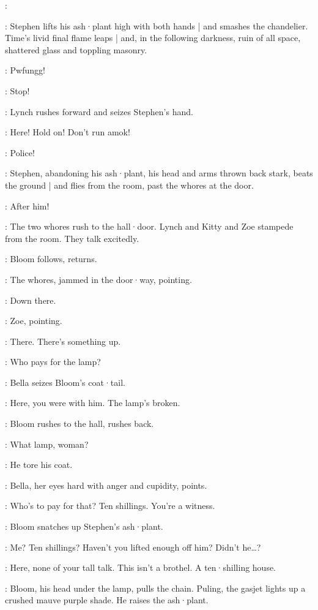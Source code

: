 \Stephen:

:
Stephen lifts his ash·plant high with both hands |
and smashes the chandelier.
Time's livid final flame leaps |
and,
in the following darkness,
ruin of all space,
shattered glass and toppling masonry.

\Gasjet[2]:
Pwfungg!

\Bloom:
Stop!

:
Lynch rushes forward and seizes Stephen's hand.

\Lynch:
Here!
Hold on!
Don't run amok!

\Bella:
Police!

:
Stephen,
abandoning his ash·plant,
his head and arms thrown back stark,
beats the ground |
and flies from the room,
past the whores at the door.

\Bella:
After him!

:
The two whores rush to the hall·door.
%
Lynch and Kitty and Zoe stampede from the room.
They talk excitedly.

:
Bloom follows,
returns.

:
The whores,
jammed in the door·way,
pointing.

\Whores:
Down there.

:
Zoe,
pointing.

\Zoe:
There.
There's something up.

\Bella:
Who pays for the lamp?

:
Bella seizes Bloom's coat·tail.

\Bella:
Here,
you were with him.
The lamp's broken.

:
Bloom rushes to the hall,
rushes back.

\Bloom:
What lamp,
woman?

\AWhore:
He tore his coat.

:
Bella,
her eyes hard with anger and cupidity,
points.

\Bella:
Who's to pay for that?
Ten shillings.
You're a witness.

:
Bloom snatches up Stephen's ash·plant.

\Bloom:
Me?
Ten shillings?
Haven't you lifted enough off him?
Didn't he…?

\Bella:
Here,
none of your tall talk.
This isn't a brothel.
A ten·shilling house.

:
Bloom,
his head under the lamp,
pulls the chain.
Puling,
the gasjet lights up a crushed mauve purple shade.
He raises the ash·plant.

